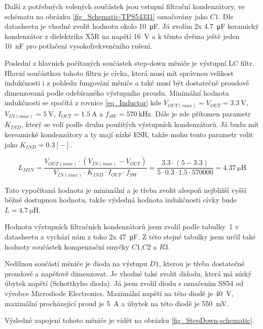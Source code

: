 Další z potřebných volených součástek jsou vstupní filtrační kondenzátory, ve schématu na obrázku \ref{fig_Schematic-TPS54331} označovány jako $C1$. Dle datasheetu je vhodné zvolit hodnotu okolo \SI{10}{\micro\farad}. Já zvolím 2x \SI{4,7}{\micro\farad} keramický kondenzátor z dielektrika X5R na napětí \SI{16}{\volt} a k těmto dvěma ještě jeden \SI{10}{\nano\farad} pro potlačení vysokofrekvenčního rušení.

Poslední z hlavních počítaných součástek step-down měniče je výstupní LC filtr. Hlavní součástkou tohoto filtru je cívka, která musí mít správnou velikost indukčnosti i z pohledu fungování měniče a také musí být dostatečně proudově dimenzovaná podle odebíraného výstupního proudu. Minimální hodnota indukčnosti se spočítá z rovnice \ref{eq_Inductor} kde $V_{OUT(max)}=V_{OUT}=\SI{3,3}{\volt}$, $V_{IN(max)}=\SI{5}{\volt}$, $I_{OUT}=\SI{1,5}{\ampere}$ a $f_{SW}=\SI{570}{\kilo\hertz}$. Dále je zde přítomen parametr $K_{IND}$, který se volí podle druhu použitých výstupních kondenzátorů. Já budu mít kereamické kondenzátory a ty mají nízké ESR, takže mohu tento parametr volit jako $K_{IND}=0.3[-]$.

\begin{equation}
    L_{MIN}=\frac{V_{OUT(max)}\cdot (V_{IN(max)}-V_{OUT})}{V_{IN(max)}\cdot K_{IND}\cdot I_{OUT}\cdot f_{SW}}=\frac{3.3\cdot (5-3.3)}{5\cdot 0.3\cdot 1.5 \cdot 570000}=\SI{4,37}{\micro\henry}
    \label{eq_Inductor}
\end{equation}

Tato vypočítaná hodnota je minimální a je třeba zvolit alespoň nejbližší vyšší běžně dostupnou hodnotu, takže výsledná hodnota indukčnosti cívky bude $L=\SI{4,7}{\micro\henry}$. 

Hodnotu výstupních filtračních kondenzátorů jsem zvolil podle tabulky~1 v datasheetu \cite{dat_TPS54331} a vychází nám z toho 2x \SI{47}{\micro\farad}. Z této stejné tabulky jsem určil také hodnoty součástek kompenzační smyčky $C1$,$C2$ a $R3$.

Nedílnou součástí měniče je dioda na výstupu $D1$, kterou je třeba dostatečně proudově a napěťově dimenzovat. Je vhodné také zvolit didodu, která má nízký úbytek napětí (Schottkyho dioda). Já jsem zvolil diodu s označením SS54 od výrobce Microdiode Electronics. Maximální napětí na této diodě je \SI{40}{\volt}, maximální procházející proud je \SI{5}{\ampere} a úbytek na této diodě je \SI{550}{\milli\volt}.

Výsledné zapojení tohoto měniče je vidět na obrázku \ref{fig_StepDown-schematic}.

